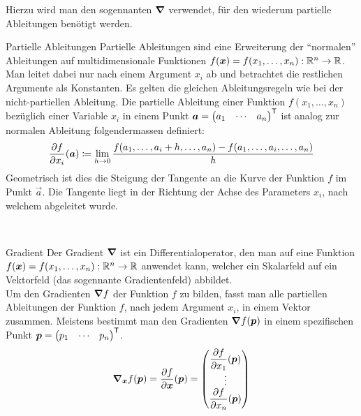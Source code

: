 \begin{appendices}
Hierzu wird man den sogennanten  $\bm{\nabla}$ verwendet,
für den wiederum partielle Ableitungen benötigt werden.
\para{}
\begin{defbox}{Partielle Ableitungen}\label{ref:partielle_ableitungen}
  Partielle Ableitungen sind eine Erweiterung der ``normalen'' Ableitungen auf
  multidimensionale Funktionen $f(\bm{x}) = f(x_1,\ldots,x_n): \mathbb{R}^n \to \mathbb{R}$.
  Man leitet dabei nur nach einem Argument $x_i$ ab und betrachtet die restlichen Argumente als Konstanten.
  Es gelten die gleichen Ableitungsregeln wie bei der nicht-partiellen Ableitung.
  Die partielle Ableitung einer Funktion $f(x_1,\ldots,x_n)$ bezüglich einer
  Variable $x_i$ in einem Punkt $\bm{a} = \begin{pmatrix} a_1 & \cdots & a_n \end{pmatrix}^{\mathsf{T}}$
  ist analog zur normalen Ableitung folgendermassen definiert:
  \begin{equation*}
    \frac{\partial f}{\partial x_i}(\bm{a}) \coloneqq \lim_{h \to 0} \frac{f(a_1,\ldots,a_i + h,\ldots,a_n)-f(a_1,\ldots,a_i,\ldots,a_n)}{h}
  \end{equation*}
  Geometrisch ist dies die Steigung der Tangente an die Kurve der Funktion $f$ im Punkt
  $\vec{a}$. Die Tangente liegt in der Richtung der Achse des Parameters $x_i$,
  nach welchem abgeleitet wurde.
\end{defbox}
\\
\begin{defbox}{Gradient}
  Der Gradient $\bm{\nabla}$ ist ein Differentialoperator, den man auf eine
  Funktion $f(\bm{x}) = f(x_1,\ldots,x_n): \mathbb{R}^n \to \mathbb{R}$ anwendet kann, welcher ein Skalarfeld auf ein Vektorfeld (das sogennante Gradientenfeld) abbildet.\\
  Um den Gradienten $\bm{\nabla}f$ der Funktion $f$ zu bilden, fasst man alle partiellen Ableitungen der Funktion $f$, nach jedem
  Argument $x_i$, in einem Vektor zusammen. Meistens bestimmt man den Gradienten
  $\bm{\nabla} f(\bm{p})$ in einem spezifischen Punkt $\bm{p} =
  \begin{pmatrix} p_1 & \cdots & p_n \end{pmatrix}^{\mathsf{T}}$.
  \begin{equation*}
    \bm{\nabla}_{\bm{x}} f(\bm{p}) = \displaystyle\frac{\partial f}{\partial \bm{x}}(\bm{p}) =
    \begin{pmatrix}
      \displaystyle\frac{\partial f}{\partial x_1}(\bm{p}) \\
      \vdots \\
      \displaystyle\frac{\partial f}{\partial x_n}(\bm{p}) \\
    \end{pmatrix}
  \end{equation*}


\end{defbox}
\end{appendices}

